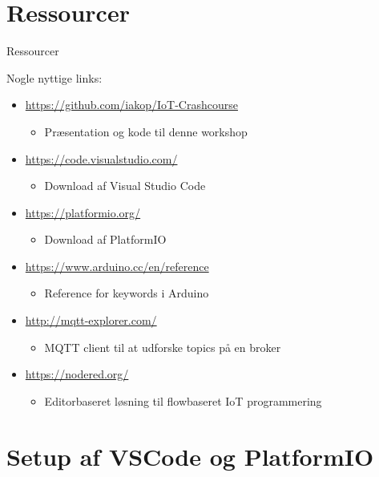\documentclass[aspectratio=169]{beamer}
\begin{document}
\section{Ressourcer}
\begin{frame}{Ressourcer}
	\begin{textBox}
	Nogle nyttige links:
		\begin{itemize}
			\item \url{https://github.com/iakop/IoT-Crashcourse}
			\begin{itemize}
				\item Præsentation og kode til denne workshop
			\end{itemize}
			\item \url{https://code.visualstudio.com/}
			\begin{itemize}
				\item Download af Visual Studio Code
			\end{itemize}
			\item \url{https://platformio.org/}
			\begin{itemize}
				\item Download af PlatformIO
			\end{itemize}
			\item \url{https://www.arduino.cc/en/reference}
			\begin{itemize}
				\item Reference for keywords i Arduino
			\end{itemize}
			\item \url{http://mqtt-explorer.com/}
			\begin{itemize}
				\item MQTT client til at udforske topics på en broker
			\end{itemize}
			\item \url{https://nodered.org/}
			\begin{itemize}
				\item Editorbaseret løsning til flowbaseret IoT programmering
			\end{itemize}
		\end{itemize}
	\end{textBox}
\end{frame}

\section{Setup af VSCode og PlatformIO}
\begin{frame}
\end{frame}
\end{document}
